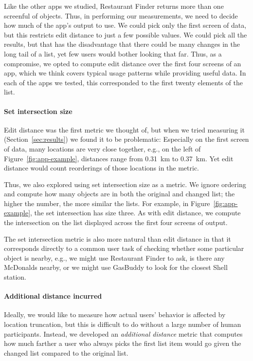 \documentclass[10pt, conference, compsocconf]{IEEEtran}
\begin{document}
{Like the other apps we studied, Restaurant Finder returns more than
one screenful of objects. Thus, in performing our measurements, we
need to decide how much of the app's output to use. We could pick only
the first screen of data, but this restricts edit distance to just
a few possible values. We could pick all the results, but that has the
disadvantage that there could be many changes in the long tail of a
list, yet few users would bother looking that far. Thus, as a
compromise, we opted to compute edit distance over the first four
screens of an app, which we think covers typical usage patterns while
providing useful data.  In each of the apps we tested, this corresponded 
to the first twenty elements of the list.

\paragraph*{Set intersection size}

Edit distance was the first metric we thought of, but when we tried
measuring it (Section~\ref{sec:results}) we found it to be
problematic: Especially on the first screen of data, many locations
are very close together, e.g., on the left of
Figure~\ref{fig:app-example}, distances range from 0.31~km to
0.37~km. Yet edit distance would count reorderings of those locations
in the metric.

Thus, we also explored using set intersection size as a metric. We
ignore ordering and compute how many objects are in both the original
and changed list; the higher the number, the more similar the
lists. For example, in Figure~\ref{fig:app-example}, the set
intersection has size three. As with edit distance, we compute the
intersection on the list displayed across the first four screens of
output.

The set intersection metric is also more natural than edit distance in
that it corresponds directly to a common user task of checking whether
some particular object is nearby, e.g., we might use Restaurant Finder
to ask, is there any McDonalds nearby, or we might use GasBuddy to
look for the closest Shell station.

\paragraph*{Additional distance incurred}

Ideally, we would like to measure how actual users' behavior is
affected by location truncation, but this is difficult to do without a large
number of human participants. Instead, we developed an \emph{additional
  distance} metric that computes how much farther a user who always
picks the first list item would go given the changed list compared to
the original list.

}
\end{document}
